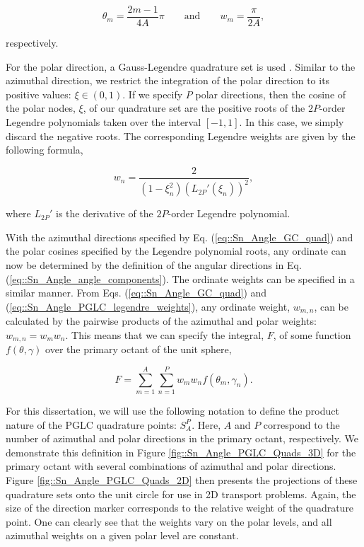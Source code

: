 \begin{equation}
\label{eq::Sn_Angle_GC_quad}
\theta_m = \frac{2m - 1}{4A} \pi \qquad \text{and} \qquad w_m = \frac{\pi}{2 A} ,
\end{equation}

\noindent respectively. 

For the polar direction, a Gauss-Legendre quadrature set is used \cite{abramowitz1964handbook}. Similar to the azimuthal direction, we restrict the integration of the polar direction to its positive values: $\xi \in (0,1)$. If we specify $P$ polar directions, then the cosine of the polar nodes, $\xi$, of our quadrature set are the positive roots of the $2P$-order Legendre polynomials taken over the interval $[-1, 1]$. In this case, we simply discard the negative roots. The corresponding Legendre weights are given by the following formula,

\begin{equation}
\label{eq::Sn_Angle_PGLC_legendre_weights}
w_n = \frac{2}{(1-\xi_n^2) (L_{2P}' (\xi_n))^2} ,
\end{equation}

\noindent where $ L_{2P}'$ is the derivative of the $2P$-order Legendre polynomial.

With the azimuthal directions specified by Eq. (\ref{eq::Sn_Angle_GC_quad}) and the polar cosines specified by the Legendre polynomial roots, any ordinate can now be determined by the definition of the angular directions in Eq. (\ref{eq::Sn_Angle_angle_components}). The ordinate weights can be specified in a similar manner. From Eqs. (\ref{eq::Sn_Angle_GC_quad}) and (\ref{eq::Sn_Angle_PGLC_legendre_weights}), any ordinate weight, $w_{m,n}$, can be calculated by the pairwise products of the azimuthal and polar weights: $w_{m,n} = w_m w_n$. This means that we can specify the integral, $F$, of some function $f (\theta, \gamma)$ over the primary octant of the unit sphere,

\begin{equation}
\label{eq::Sn_Angle_PGLC_product_weights}
F = \sum_{m=1}^{A} \sum_{n=1}^{P} w_m w_n  f(\theta_m , \gamma_n).
\end{equation}

For this dissertation, we will use the following notation to define the product nature of the PGLC quadrature points: $S_{A}^{P}$. Here, $A$ and $P$ correspond to the number of azimuthal and polar directions in the primary octant, respectively. We demonstrate this definition in Figure \ref{fig::Sn_Angle_PGLC_Quads_3D} for the primary octant with several combinations of azimuthal and polar directions. Figure \ref{fig::Sn_Angle_PGLC_Quads_2D} then presents the projections of these quadrature sets onto the unit circle for use in 2D transport problems. Again, the size of the direction marker corresponds to the relative weight of the quadrature point. One can clearly see that the weights vary on the polar levels, and all azimuthal weights on a given polar level are constant.

